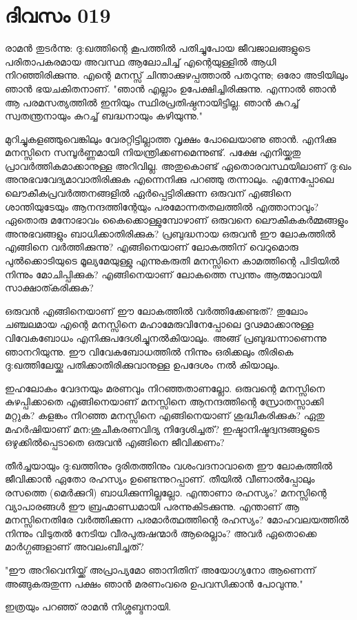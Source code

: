 \newpage
\section{ദിവസം 019}


രാമന്‍ തുടര്‍ന്നു: ദു:ഖത്തിന്റെ കൂപത്തില്‍ പതിച്ചുപോയ ജീവജാലങ്ങളുടെ പരിതാപകരമായ അവസ്ഥ ആലോചിച്ച്‌ എന്റെയുള്ളില്‍ ആധി നിറഞ്ഞിരിക്കുന്നു. എന്റെ മനസ്സ്‌ ചിന്താക്കുഴപ്പത്താല്‍ പതറുന്നു; ഒരോ അടിയിലും ഞാന്‍ ഭയചകിതനാണ്‌.  "ഞാന്‍ എല്ലാം ഉപേക്ഷിച്ചിരിക്കുന്നു. എന്നാല്‍ ഞാന്‍ ആ പരമസത്യത്തില്‍ ഇനിയും സ്ഥിരപ്രതിഷ്ഠനായിട്ടില്ല. ഞാന്‍ കുറച്ച്‌ സ്വതന്ത്രനായും കുറച്ച്‌ ബദ്ധനായും കഴിയുന്നു."

മുറിച്ചുകളഞ്ഞുവെങ്കിലും വേരറ്റിട്ടില്ലാത്ത വൃക്ഷം പോലെയാണു ഞാന്‍. എനിക്കു മനസ്സിനെ സമ്പൂര്‍ണ്ണമായി നിയന്ത്രിക്കണമെന്നുണ്ട്‌. പക്ഷേ എനിയ്ക്കതു പ്രാവര്‍ത്തികമാക്കാനുള്ള അറിവില്ല. അതുകൊണ്ട്‌ ഏതൊരവസ്ഥയിലാണ്‌ ദു:ഖം അനുഭവവേദ്യമാവാതിരിക്കുക എന്നെനിക്കു പറഞ്ഞു തന്നാലും. എന്നേപ്പോലെ ലൌകീകപ്രവര്‍ത്തനങ്ങളില്‍ ഏര്‍പ്പെട്ടിരിക്കുന്ന ഒരുവന്‌ എങ്ങിനെ ശാന്തിയുടേയും ആനന്ദത്തിന്റേയും പരമോന്നതതലത്തില്‍ എത്താനാവും? ഏതൊരു മനോഭാവം കൈക്കൊള്ളുമ്പോഴാണ്‌ ഒരുവനെ ലൌകീകകര്‍മ്മങ്ങളും അനുഭവങ്ങളും ബാധിക്കാതിരിക്കുക? പ്രബുദ്ധനായ ഒരുവന്‍ ഈ ലോകത്തില്‍ എങ്ങിനെ  വര്‍ത്തിക്കുന്നു? എങ്ങിനെയാണ്‌ ലോകത്തിന്‌ വെറുമൊരു പുല്‍ക്കൊടിയുടെ മൂല്യമേയുള്ളു എന്നുകരുതി മനസ്സിനെ കാമത്തിന്റെ പിടിയില്‍ നിന്നും മോചിപ്പിക്കുക? എങ്ങിനെയാണ്‌ ലോകത്തെ സ്വന്തം ആത്മാവായി സാക്ഷാത്കരിക്കുക?

ഒരുവന്‍ എങ്ങിനെയാണ്‌ ഈ ലോകത്തില്‍ വര്‍ത്തിക്കേണ്ടത്‌? തുലോം ചഞ്ചലമായ എന്റെ മനസ്സിനെ മഹാമേരുവിനേപ്പോലെ ദൃഢമാക്കാനുള്ള വിവേകബോധം എനിക്കുപദേശിച്ചുനല്‍കിയാലും. അങ്ങ്‌ പ്രബുദ്ധന്നാണെന്നു ഞാനറിയുന്നു. ഈ വിവേകബോധത്തില്‍ നിന്നും ഒരിക്കലും തിരികെ ദു:ഖത്തിലേയ്ക്കു പതിക്കാതിരിക്കുവാനുള്ള ഉപദേശം നല്‍ കിയാലും. 

ഇഹലോകം വേദനയും മരണവും നിറഞ്ഞതാണല്ലോ. ഒരുവന്റെ മനസ്സിനെ കുഴപ്പിക്കാതെ എങ്ങിനെയാണ്‌ മനസ്സിനെ ആനന്ദത്തിന്റെ സ്രോതസ്സാക്കി മറ്റുക? കളങ്കം നിറഞ്ഞ മനസ്സിനെ എങ്ങിനെയാണ്‌ ശുദ്ധീകരിക്കുക? ഏതു മഹര്‍ഷിയാണ്‌ മന:ശുചീകരണവിദ്യ നിദ്ദേശിച്ചത്‌? ഇഷ്ടാനിഷ്ടദ്വന്ദങ്ങളുടെ ഒഴുക്കില്‍പ്പെടാതെ ഒരുവന്‍ എങ്ങിനെ ജീവിക്കണം?

തീര്‍ച്ചയായും ദു:ഖത്തിനും ദുരിതത്തിനും വശംവദനാവാതെ ഈ ലോകത്തില്‍ ജീവിക്കാന്‍ ഏതോ രഹസ്യം ഉണ്ടെന്നുറപ്പാണ്‌. തീയില്‍ വീണാല്‍പ്പോലും രസത്തെ (മെര്‍ക്കുറി)  ബാധിക്കുന്നില്ലല്ലോ. എന്താണാ രഹസ്യം? മനസ്സിന്റെ വ്യാപാരങ്ങള്‍ ഈ ബ്രഹ്മാണ്ഡമായി പരന്നുകിടക്കുന്നു. എന്താണ്‌ ആ മനസ്സിനെതിരേ വര്‍ത്തിക്കുന്ന പരമാര്‍ത്ഥത്തിന്റെ രഹസ്യം? മോഹവലയത്തില്‍ നിന്നും വിടുതല്‍ നേടിയ വീരപുരുഷന്മാര്‍ ആരെല്ലാം? അവര്‍ ഏതൊക്കെ മാര്‍ഗ്ഗങ്ങളാണ്‌ അവലംബിച്ചത്‌? 

"ഈ അറിവെനിയ്ക്ക്‌ അപ്രാപ്യമോ ഞാനിതിന്‌ അയോഗ്യനോ ആണെന്ന്‌ അങ്ങുകരുതുന്ന പക്ഷം ഞാന്‍ മരണംവരെ ഉപവസിക്കാന്‍ പോവുന്നു."

ഇത്രയും പറഞ്ഞ്‌ രാമന്‍ നിശ്ശബ്ദനായി.
